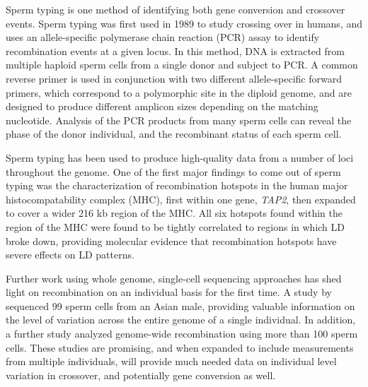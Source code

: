 Sperm typing is one method of identifying both gene conversion and crossover events.
Sperm typing was first used in 1989 to study crossing over in humans\cite{Cui1989}, and uses
an allele-specific polymerase chain reaction (PCR) assay to identify recombination events at a given locus.
In this method, DNA is extracted from multiple haploid sperm cells from a single donor and subject to PCR.
A common reverse primer is used in conjunction with two different allele-specific forward primers, which correspond to a polymorphic site in the diploid genome, and are designed to produce different amplicon sizes depending on the matching nucleotide.
Analysis of the PCR products from many sperm cells can reveal the phase of the donor individual, and the recombinant status of each sperm cell.

Sperm typing has been used to produce high-quality data from a number of loci throughout the genome.
One of the first major findings to come out of sperm typing was the characterization of recombination hotspots in the human major histocompatability complex (MHC), first within one gene, \textit{TAP2}\cite{Jeffreys2000}, then expanded to cover a wider 216 kb region of the MHC\cite{Jeffreys2001}.
All six hotspots found within the region of the MHC were found to be tightly correlated to regions in which LD broke down, providing molecular evidence that recombination hotspots have severe effects on LD patterns.



Further work using whole genome, single-cell sequencing approaches has shed light on recombination on an individual basis for the first time.
A study by \citet{Lu2012} sequenced 99 sperm cells from an Asian male, providing valuable information on the level of variation across the entire genome of a single individual.
In addition, a further study analyzed genome-wide recombination using more than 100 sperm cells\cite{Wang2012}.
These studies are promising, and when expanded to include measurements from multiple individuals, will provide much needed data on individual level variation in crossover, and potentially gene conversion as well.


